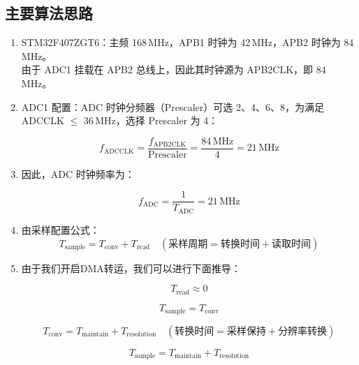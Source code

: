\documentclass{article}
\begin{document}
\subsection{主要算法思路}
\begin{enumerate}

\item STM32F407ZGT6：主频 168\,MHz，APB1 时钟为 42\,MHz，APB2 时钟为 84\,MHz。
\\由于 ADC1 挂载在 APB2 总线上，因此其时钟源为 APB2CLK，即 84\,MHz。

\item ADC1 配置：ADC 时钟分频器（Prescaler）可选 2、4、6、8，为满足 ADCCLK $\leq$ 36\,MHz，选择 Prescaler 为 4：

\begin{equation}
f_{\text{ADCCLK}} = \frac{f_{\text{APB2CLK}}}{\text{Prescaler}} = \frac{84\,\text{MHz}}{4} = 21\,\text{MHz}
\end{equation}

\item 因此，ADC 时钟频率为：

\begin{equation}
f_{\text{ADC}} = \frac{1}{T_{\text{ADC}}} = 21\,\text{MHz}
\end{equation}


\item 由采样配置公式：
\begin{equation}
T_{\text{sample}} = T_{\text{conv}} + T_{\text{read}} \quad (\text{采样周期} = \text{转换时间} + \text{读取时间})
\end{equation}

\item 由于我们开启DMA转运，我们可以进行下面推导：

\begin{equation}
T_{\text{read}} \approx 0
\end{equation}

\begin{equation}
T_{\text{sample}} = T_{\text{conv}} 
\end{equation}

\begin{equation}
T_{\text{conv}} = T_{\text{maintain}} + T_{\text{resolution}} \quad (\text{转换时间} = \text{采样保持} + \text{分辨率转换})
\end{equation}

\begin{equation}
T_{\text{sample}} = T_{\text{maintain}} + T_{\text{resolution}} 
\end{equation}


\end{enumerate}
\end{document}
